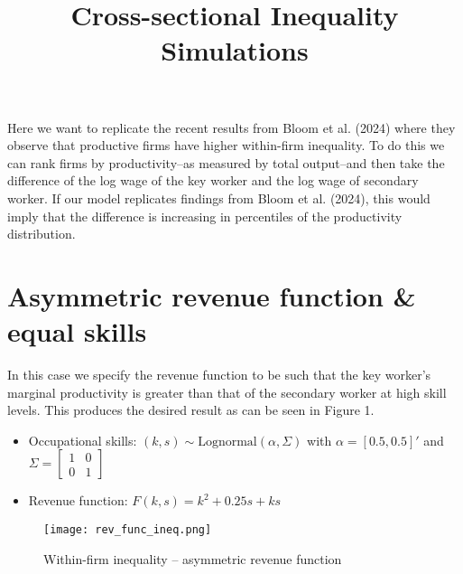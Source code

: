 \documentclass{article}
\title{Cross-sectional Inequality Simulations}
\author{}
\date{}
\begin{document}
	
	\maketitle
	\vspace{-2cm}
	Here we want to replicate the recent results from Bloom et al. (2024) where they observe that productive firms have higher within-firm inequality. To do this we can rank firms by productivity--as measured by total output--and then take the difference of the log wage of the key worker and the log wage of secondary worker. If our model replicates findings from Bloom et al. (2024), this would imply that the difference is increasing in percentiles of the productivity distribution.
	\section*{Asymmetric revenue function \& equal skills}
	In this case we specify the revenue function to be such that the key worker's marginal productivity is greater than that of the secondary worker at high skill levels. This produces the desired result as can be seen in Figure 1.
	\begin{itemize}
		\item Occupational skills: $(k,s) \sim \text{Lognormal}(\alpha,\Sigma)$ with $\alpha = [0.5,0.5]'$ and $\Sigma = \begin{bmatrix}
			1 & 0\\
			0 & 1
		\end{bmatrix}$
		\item Revenue function: $F(k,s) = k^2 + 0.25s + ks$
	\end{itemize}
	\begin{figure}[H]
		\centering
		\texttt{[image: rev\_func\_ineq.png]}
		\caption{Within-firm inequality -- asymmetric revenue function}
	\end{figure}
\end{document}
